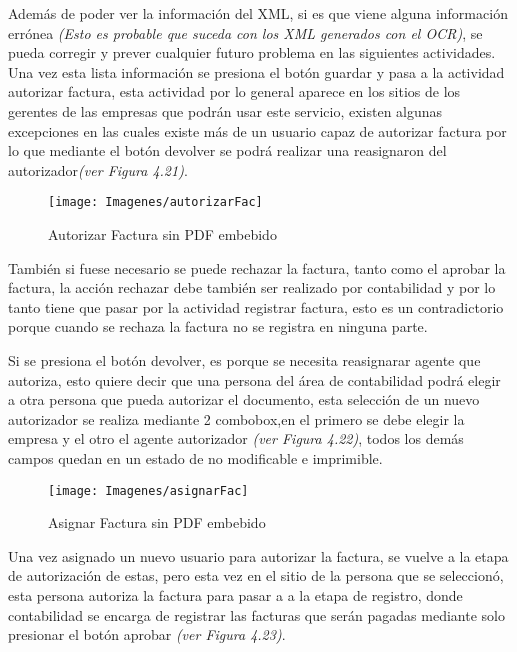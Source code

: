 		Además de poder ver la información del XML, si es que viene alguna información errónea \textit{(Esto es probable que suceda con los XML generados con el OCR)}, se pueda corregir y prever cualquier futuro problema en las siguientes actividades. Una vez esta lista información se presiona el botón guardar y pasa a la actividad autorizar factura, esta actividad por lo general aparece en los sitios de los gerentes de las empresas que podrán usar este servicio, existen algunas excepciones en las cuales existe más de un usuario capaz de autorizar factura por lo que mediante el botón devolver se podrá realizar una reasignaron del autorizador\textit{(ver Figura 4.21)}. 
		
		\begin{figure}[H]
			\texttt{[image: Imagenes/autorizarFac]}
			\caption{Autorizar Factura sin PDF embebido}
		\end{figure}		
		
		También si fuese necesario se puede rechazar la factura, tanto como el aprobar la factura, la acción rechazar debe también ser realizado por contabilidad y por lo tanto tiene que pasar por la actividad registrar factura, esto es un contradictorio porque cuando se rechaza la factura no se registra en ninguna parte.
		\newline
		\par		
		Si se presiona el botón devolver, es porque se necesita reasignarar agente que autoriza, esto quiere decir que una persona del área de contabilidad podrá elegir a otra persona que pueda autorizar el documento, esta selección de un nuevo autorizador se realiza mediante 2 combobox,en el primero se debe elegir la empresa y el otro el agente autorizador \textit{(ver Figura 4.22)}, todos los demás campos quedan en un estado de no modificable e imprimible.
		
		\begin{figure}[H]
			\texttt{[image: Imagenes/asignarFac]}
			\caption{Asignar Factura sin PDF embebido}
		\end{figure}	

		Una vez asignado un nuevo usuario para autorizar la factura, se vuelve a la etapa de autorización de estas, pero esta vez en el sitio de la persona que se seleccionó, esta persona autoriza la factura para pasar a a la etapa de registro, donde contabilidad se encarga de registrar las facturas que serán pagadas mediante solo presionar el botón aprobar \textit{(ver Figura 4.23)}.
				
